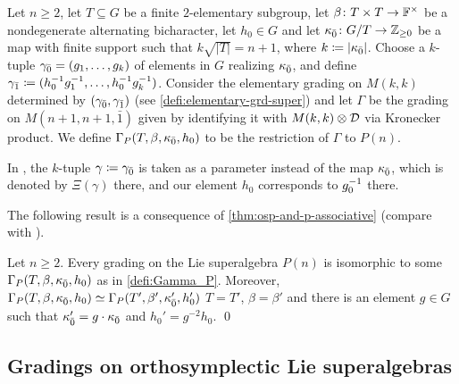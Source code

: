 \begin{defi}\label{defi:Gamma_P}
    Let $n\geq 2$, 
    let $T \subseteq G$ be a finite $2$-elementary subgroup, let $\beta\colon {T\times T} \to \mathbb{F}^\times$ be a nondegenerate alternating bicharacter, let $h_0 \in G$
    and let $\kappa_{\bar{0}}\colon G/T \to \mathbb{Z}_{\geq 0}$ be a map with finite support such that $k \sqrt{|T|} = n+1$, where $k \coloneqq |\kappa_{\bar{0}}|$. 
    Choose a $k$-tuple $\gamma_{\bar{0}} = (g_1, \ldots, g_k)$ of elements in $G$ realizing $\kappa_{\bar{0}}$, 
    and define $\gamma_{\bar{1}} \coloneqq (h_0^{-1} g_1^{-1}, \ldots, h_0^{-1} g_k^{-1})$. 
    Consider the elementary grading on $M(k,k)$ determined by $(\gamma_{\bar{0}}, \gamma_{\bar{1}})$ (see \cref{defi:elementary-grd-super}) and let $\Gamma$ be the grading on $M(n+1, n+1, \bar 1)$ given by identifying it with $M(k,k) \otimes \mathcal{D}$ via Kronecker product. 
    We define $\Gamma_P (T, \beta, \kappa_{\bar{0}}, h_0)$ to be the restriction of $\Gamma$ to $P(n)$. 
\end{defi}


\begin{remark}
    In \cite{paper-MAP}, the $k$-tuple $\gamma \coloneqq \gamma_{\bar{0}}$ is taken as a parameter instead of the map $\kappa_{\bar{0}}$, which is denoted by $\Xi (\gamma)$ there, and our element $h_0$ corresponds to $g_0^{-1}$ there. 
\end{remark}

The following result is a consequence of \cref{thm:osp-and-p-associative} (compare with \cite[Theorem 6.9]{paper-MAP}). 

\begin{thm}\label{thm:last-one-for-P}
    Let $n \geq 2$. 
    Every grading on the Lie superalgebra $P(n)$ is isomorphic to some $\Gamma_P (T, \beta, \kappa_{\bar{0}}, h_0)$ as in \cref{defi:Gamma_P}. 
    Moreover, $\Gamma_P (T, \beta, \kappa_{\bar{0}}, h_0) \simeq \Gamma_P (T', \beta', \kappa_{\bar{0}}', h_0')$ \IFF $T = T'$, $\beta = \beta'$ and there is an element $g\in G$ such that $\kappa_{\bar{0}}' = g \cdot \kappa_{\bar{0}}$ and $h_0' = g^{-2} h_0$. \qed 
\end{thm}


\subsection{Gradings on orthosymplectic Lie superalgebras}\label{ssec:grds-osp} 

